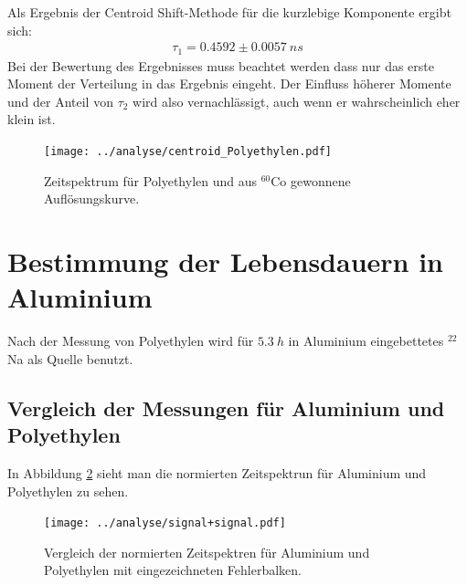 \documentclass[a4paper,12pt]{article}
\begin{document}
Als Ergebnis der Centroid Shift-Methode für die kurzlebige Komponente ergibt sich:
\begin{align*}
	τ_1 = 0.4592 \pm \SI{0.0057}{ns}
\end{align*}  
Bei der Bewertung des Ergebnisses muss beachtet werden dass nur das 
erste Moment der Verteilung in das Ergebnis eingeht. Der Einfluss höherer Momente und der Anteil von $τ_2$ wird also vernachlässigt, auch wenn er wahrscheinlich eher klein ist.
\begin{figure}
	\texttt{[image: ../analyse/centroid\_Polyethylen.pdf]}
	\caption{Zeitspektrum für Polyethylen und aus $^{60}$Co gewonnene Auflösungskurve. }
	\label{fig:compare_signal}
\end{figure}
 
\section{Bestimmung der Lebensdauern in Aluminium}
Nach der Messung von Polyethylen wird für $\SI{5.3}{h}$ in Aluminium eingebettetes $^{22}$Na als Quelle benutzt.

\subsection{Vergleich der Messungen für Aluminium und Polyethylen}
In Abbildung \ref{fig:compare_signal} sieht man die normierten Zeitspektrun für Aluminium und
Polyethylen zu sehen.
\begin{figure}[h]
	\texttt{[image: ../analyse/signal+signal.pdf]}
	\caption{Vergleich der normierten Zeitspektren für Aluminium und Polyethylen mit eingezeichneten Fehlerbalken.}
	\label{fig:compare_signal}
\end{figure}
\end{document}
